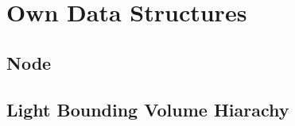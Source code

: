
\chapter{Own Data Structures}
\label{ch:data}

\section{Node}
\label{sec:data:node}

\section{Light Bounding Volume Hiarachy}
\label{sec:data:lbvh}